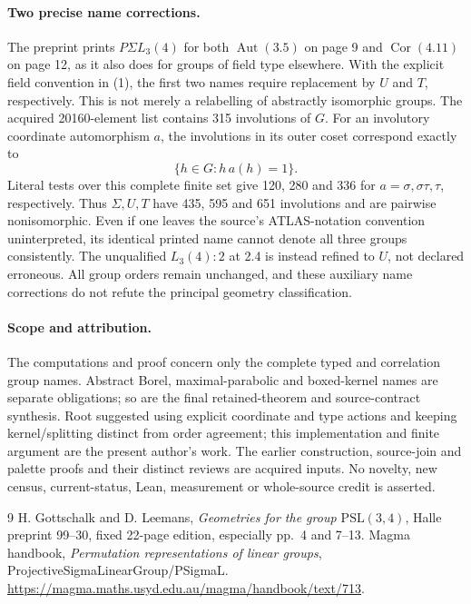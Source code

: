\documentclass[11pt]{article}
\newcommand{\Aut}{\operatorname{Aut}}\newcommand{\Cor}{\operatorname{Cor}}
\begin{document}
\paragraph{Two precise name corrections.}
The preprint prints $P\Sigma L_3(4)$ for both $\Aut(3.5)$ on page 9 and
$\Cor(4.11)$ on page 12, as it also does for groups of field type elsewhere.
With the explicit field convention in (1), the first two names require
replacement by $U$ and $T$, respectively. This is not merely a relabelling
of abstractly isomorphic groups. The acquired 20160-element list contains
315 involutions of $G$. For an involutory coordinate automorphism $a$,
the involutions in its outer coset correspond exactly to
\[
 \{h\in G:h\,a(h)=1\}.
\]
Literal tests over this complete finite set give 120, 280 and 336 for
$a=\sigma,\sigma\tau,\tau$, respectively. Thus $\Sigma,U,T$ have
435, 595 and 651 involutions and are pairwise nonisomorphic. Even if one
leaves the source's ATLAS-notation convention uninterpreted, its identical
printed name cannot denote all three groups consistently. The unqualified
$L_3(4):2$ at 2.4 is instead refined to $U$, not declared erroneous.
All group orders remain unchanged, and these auxiliary name corrections
do not refute the principal geometry classification.

\paragraph{Scope and attribution.}
The computations and proof concern only the complete typed and correlation
group names. Abstract Borel, maximal-parabolic and boxed-kernel names are
separate obligations; so are the final retained-theorem and source-contract
synthesis. Root suggested using explicit coordinate and type actions and
keeping kernel/splitting distinct from order agreement; this implementation
and finite argument are the present author's work. The earlier construction,
source-join and palette proofs and their distinct reviews are acquired inputs.
No novelty, new census, current-status, Lean, measurement or whole-source
credit is asserted.

\begin{thebibliography}{9}
 H. Gottschalk and D. Leemans, \emph{Geometries for the group
$\mathrm{PSL}(3,4)$}, Halle preprint 99--30, fixed 22-page edition,
especially pp.~4 and 7--13.
 Magma handbook, \emph{Permutation representations of linear
groups}, ProjectiveSigmaLinearGroup/PSigmaL.\newline
\url{https://magma.maths.usyd.edu.au/magma/handbook/text/713}.
\end{thebibliography}
\end{document}
